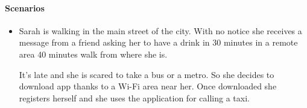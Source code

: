 \paragraph{Scenarios}
\begin{itemize}
	\item Sarah is walking in the main street of the city. With no notice she receives a message from a friend asking her to have a drink in 30 minutes in a remote area 40 minutes walk from where she is.\par It's late and she is scared to take a bus or a metro. So she decides to download \myTaxiService{} app thanks to a Wi-Fi area near her. Once downloaded she registers herself and she uses the application for calling a taxi.
\end{itemize}
